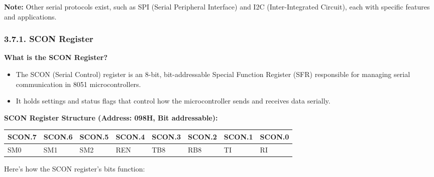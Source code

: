 \documentclass[
]{article}
\begin{document}
\textbf{Note:} Other serial protocols exist, such as SPI (Serial
Peripheral Interface) and I2C (Inter-Integrated Circuit), each with
specific features and applications.

\hypertarget{371-scon-register}{%
\subsubsection{3.7.1. SCON Register}\label{371-scon-register}}

\textbf{What is the SCON Register?}

\begin{itemize}
\item
  The SCON (Serial Control) register is an 8-bit, bit-addressable
  Special Function Register (SFR) responsible for managing serial
  communication in 8051 microcontrollers.
\item
  It holds settings and status flags that control how the
  microcontroller sends and receives data serially.
\end{itemize}

\textbf{SCON Register Structure (Address: 098H, Bit addressable):}

\begin{longtable}[]{@{}llllllll@{}}
\toprule
SCON.7 & SCON.6 & SCON.5 & SCON.4 & SCON.3 & SCON.2 & SCON.1 & SCON.0 \\
\midrule
\endhead
SM0 & SM1 & SM2 & REN & TB8 & RB8 & TI & RI \\
\bottomrule
\end{longtable}

Here's how the SCON register's bits function:
\end{document}

